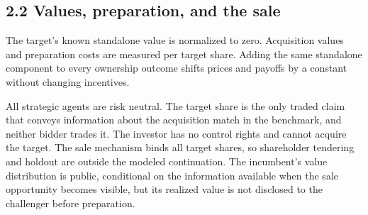 
\subsection{2.2 Values, preparation, and the
sale}\label{sec-values-preparation-and-the-sale}

The target's known standalone value is normalized to zero. Acquisition
values and preparation costs are measured per target share. Adding the
same standalone component to every ownership outcome shifts prices and
payoffs by a constant without changing incentives.

All strategic agents are risk neutral. The target share is the only
traded claim that conveys information about the acquisition match in the
benchmark, and neither bidder trades it. The investor has no control
rights and cannot acquire the target. The sale mechanism binds all
target shares, so shareholder tendering and holdout are outside the
modeled continuation. The incumbent's value distribution is public,
conditional on the information available when the sale opportunity
becomes visible, but its realized value is not disclosed to the
challenger before preparation.

